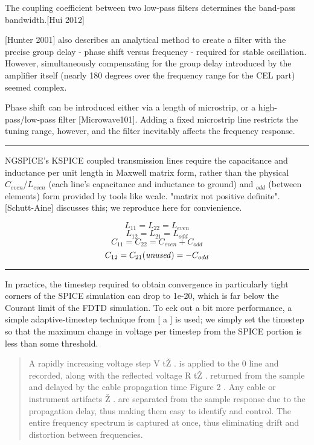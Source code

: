 \documentclass[paper.tex]{subfiles}
\begin{document}
The coupling coefficient between two low-pass filters determines the band-pass bandwidth.[Hui 2012]

[Hunter 2001] also describes an analytical method to create a filter with the precise group delay - phase shift versus frequency - required for stable oscillation. However, simultaneously compensating for the group delay introduced by the amplifier itself (nearly 180 degrees over the frequency range for the CEL part) seemed complex.

Phase shift can be introduced either via a length of microstrip, or a high-pass/low-pass filter [Microwave101]. Adding a fixed microstrip line restricts the tuning range, however, and the filter inevitably affects the frequency response.  

\rule{\linewidth}{0.2pt}

NGSPICE's KSPICE coupled transmission lines require the capacitance and inductance per unit length in Maxwell matrix form, rather than the physical $C_{even}$/$L_{even}$ (each line's capacitance and inductance to ground) and $_{odd}$ (between elements) form provided by tools like wcalc. "matrix not positive definite". [Schutt-Aine] discusses this; we reproduce here for convienience.

\[ L_{11} = L_{22} = L_{even}  \]
\[ L_{12} = L_{21} = L_{odd}  \]
\[ C_{11} = C_{22} = C_{even}+C_{odd}  \]
\[ C_{12} = C_{21} {\it{(unused)}} = -C_{odd}  \]

\rule{\linewidth}{0.2pt}

In practice, the timestep required to obtain convergence in particularly tight corners of the SPICE simulation can drop to 1e-20, which is far below the Courant limit of the FDTD simulation. To eek out a bit more performance, a simple adaptive-timestep technique from [ a ] is used; we simply set the timestep so that the maximum change in voltage per timestep from the SPICE portion is less than 
some threshold.



\begin{quote}
A rapidly increasing voltage step V tŽ . is applied to the 0
line and recorded, along with the reflected voltage R tŽ .
returned from the sample and delayed by the cable propagation time Figure 2 . Any cable or instrument artifacts Ž .
are separated from the sample response due to the propagation delay, thus making them easy to identify and control. The entire frequency spectrum is captured at once,
thus eliminating drift and distortion between frequencies.
\end{quote}
\end{document}
